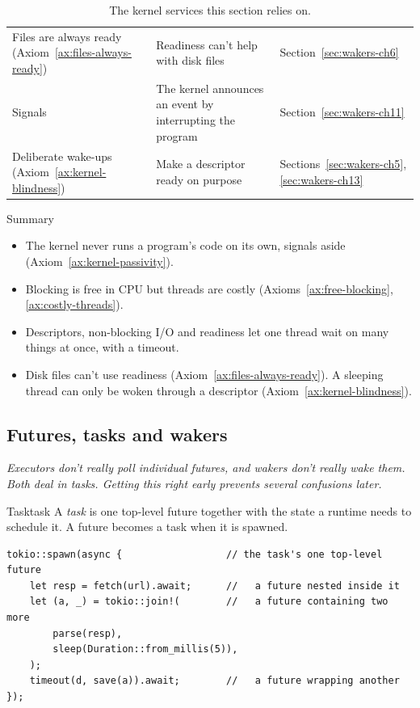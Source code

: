 \begin{table}[htbp]
\begin{tabularx}{\linewidth}{>{\raggedright\arraybackslash}p{4.4cm} Y >{\raggedright\arraybackslash}p{3.2cm}}
        Files are always ready (Axiom~\ref{ax:files-always-ready}) & Readiness can't help with disk files & Section~\ref{sec:wakers-ch6} \\
        Signals & The kernel announces an event by interrupting the program & Section~\ref{sec:wakers-ch11} \\
        Deliberate wake-ups (Axiom~\ref{ax:kernel-blindness}) & Make a descriptor ready on purpose & Sections~\ref{sec:wakers-ch5}, \ref{sec:wakers-ch13} \\
        \bottomrule
    \end{tabularx}
    \caption{The kernel services this section relies on.}
    \label{tab:wakers-2.1}
\end{table}

\begin{quotebox}{Summary}
    \begin{itemize}
        \item The kernel never runs a program's code on its own, signals aside (Axiom~\ref{ax:kernel-passivity}).
        \item Blocking is free in CPU but threads are costly (Axioms~\ref{ax:free-blocking}, \ref{ax:costly-threads}).
        \item Descriptors, non-blocking I/O and readiness let one thread wait on many things at once, with a timeout.
        \item Disk files can't use readiness (Axiom~\ref{ax:files-always-ready}). A sleeping thread can only be woken through a descriptor (Axiom~\ref{ax:kernel-blindness}).
    \end{itemize}
\end{quotebox}

\subsection{Futures, tasks and wakers}
\label{sec:wakers-ch3}

\textit{Executors don't really poll individual futures, and wakers don't really wake them. Both deal in tasks. Getting this right early prevents several confusions later.}

\begin{definition}{Task}{task}
    A \emph{task} is one top-level future together with the state a runtime needs to schedule it. A future becomes a task when it is spawned.
\end{definition}

\begin{lstlisting}[caption={One task, many futures.}, label=lst:wakers-3.1]
tokio::spawn(async {                  // the task's one top-level future
    let resp = fetch(url).await;      //   a future nested inside it
    let (a, _) = tokio::join!(        //   a future containing two more
        parse(resp),
        sleep(Duration::from_millis(5)),
    );
    timeout(d, save(a)).await;        //   a future wrapping another
});
\end{lstlisting}

